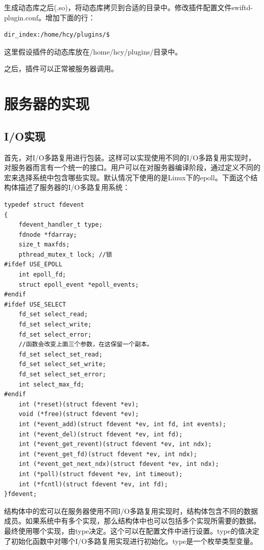 \documentclass[twoside, xetex]{report}
\begin{document}
	生成动态库之后(.so)，将动态库拷贝到合适的目录中。修改插件配置文件swiftd-plugin.conf。增加下面的行：
\begin{lstlisting}
dir_index:/home/hcy/plugins/$
\end{lstlisting}

	这里假设插件的动态库放在/home/hcy/plugins/目录中。
	
	之后，插件可以正常被服务器调用。
	
\section{服务器的实现}

\subsection{I/O实现}
	首先，对I/O多路复用进行包装。这样可以实现使用不同的I/O多路复用实现时，对服务器而言有一个统一的接口。用户可以在对服务器编译阶段，通过定义不同的宏来选择系统中包含哪些实现。默认情况下使用的是Linux下的epoll。下面这个结构体描述了服务器的I/O多路复用系统：
\begin{lstlisting}	
typedef struct fdevent
{
	fdevent_handler_t type;
	fdnode *fdarray;
	size_t maxfds;
	pthread_mutex_t lock; //锁
#ifdef USE_EPOLL
	int epoll_fd;
	struct epoll_event *epoll_events;
#endif
#ifdef USE_SELECT
	fd_set select_read;
	fd_set select_write;
	fd_set select_error;
	//函数会改变上面三个参数，在这保留一个副本。
	fd_set select_set_read;
	fd_set select_set_write;
	fd_set select_set_error;
	int select_max_fd;
#endif
	int (*reset)(struct fdevent *ev);
	void (*free)(struct fdevent *ev);
	int (*event_add)(struct fdevent *ev, int fd, int events);
	int (*event_del)(struct fdevent *ev, int fd);
	int (*event_get_revent)(struct fdevent *ev, int ndx);
	int (*event_get_fd)(struct fdevent *ev, int ndx);
	int (*event_get_next_ndx)(struct fdevent *ev, int ndx);
	int (*poll)(struct fdevent *ev, int timeout);
	int (*fcntl)(struct fdevent *ev, int fd);
}fdevent;
\end{lstlisting}

	结构体中的宏可以在服务器使用不同I/O多路复用实现时，结构体包含不同的数据成员。如果系统中有多个实现，那么结构体中也可以包括多个实现所需要的数据。最终使用哪个实现，由type决定。这个可以在配置文件中进行设置。type的值决定了初始化函数中对哪个I/O多路复用实现进行初始化。type是一个枚举类型变量。
	
\end{document}
